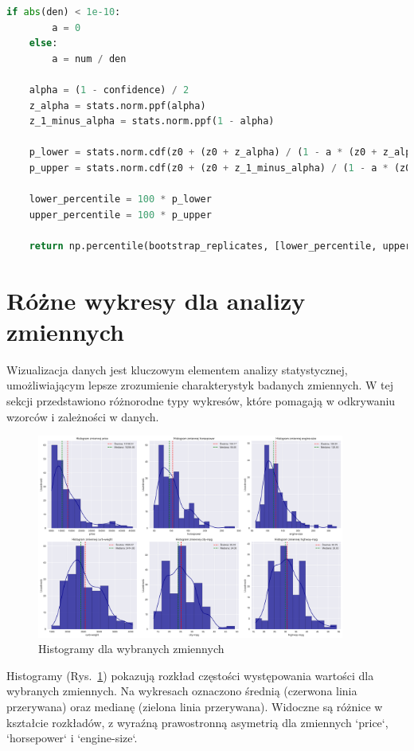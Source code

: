 \documentclass[12pt,a4paper]{article}
\begin{document}
\begin{lstlisting}[language=Python, caption=Funkcje do obliczania przedziałów ufności]
    if abs(den) < 1e-10:
        a = 0
    else:
        a = num / den
    
    alpha = (1 - confidence) / 2
    z_alpha = stats.norm.ppf(alpha)
    z_1_minus_alpha = stats.norm.ppf(1 - alpha)
    
    p_lower = stats.norm.cdf(z0 + (z0 + z_alpha) / (1 - a * (z0 + z_alpha)))
    p_upper = stats.norm.cdf(z0 + (z0 + z_1_minus_alpha) / (1 - a * (z0 + z_1_minus_alpha)))
    
    lower_percentile = 100 * p_lower
    upper_percentile = 100 * p_upper
    
    return np.percentile(bootstrap_replicates, [lower_percentile, upper_percentile])
\end{lstlisting}

\section{Różne wykresy dla analizy zmiennych}

Wizualizacja danych jest kluczowym elementem analizy statystycznej, umożliwiającym lepsze zrozumienie charakterystyk badanych zmiennych. W tej sekcji przedstawiono różnorodne typy wykresów, które pomagają w odkrywaniu wzorców i zależności w danych.

\begin{figure}[H]
    \centering
    \includegraphics[width=0.9\textwidth]{figures/histograms.png}
    \caption{Histogramy dla wybranych zmiennych}
    \label{fig:histograms}
\end{figure}

Histogramy (Rys.~\ref{fig:histograms}) pokazują rozkład częstości występowania wartości dla wybranych zmiennych. Na wykresach oznaczono średnią (czerwona linia przerywana) oraz medianę (zielona linia przerywana). Widoczne są różnice w kształcie rozkładów, z wyraźną prawostronną asymetrią dla zmiennych `price`, `horsepower` i `engine-size`.
\end{document}
